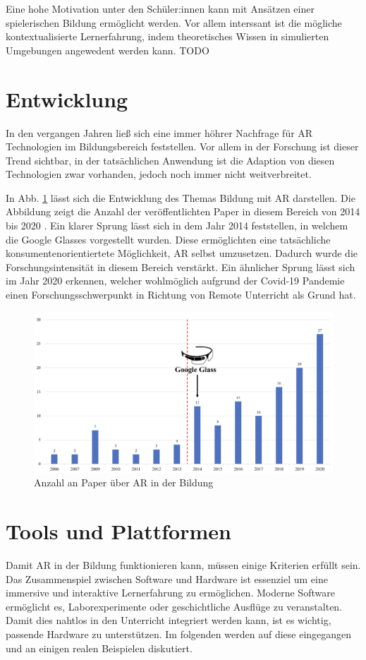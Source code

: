 \documentclass[conference]{IEEEtran}
\begin{document}
Eine hohe Motivation unter den Schüler:innen 
kann mit Ansätzen einer spielerischen Bildung ermöglicht werden. Vor allem interssant ist 
die mögliche kontextualisierte Lernerfahrung, indem theoretisches Wissen in simulierten 
Umgebungen angewedent werden kann. \cite{b2} TODO

\section{Entwicklung}
In den vergangen Jahren ließ sich eine immer höhrer Nachfrage für AR Technologien im Bildungsbereich
feststellen. Vor allem in der Forschung ist dieser Trend sichtbar, in der tatsächlichen Anwendung ist die
Adaption von diesen Technologien zwar vorhanden, jedoch noch immer nicht weitverbreitet. \cite{b3}

In Abb. \ref{fig1} lässt sich die Entwicklung des Themas Bildung mit AR darstellen. Die Abbildung zeigt die Anzahl
der veröffentlichten Paper in diesem Bereich von 2014 bis 2020 \cite{w2}. Ein klarer Sprung lässt sich in dem Jahr 2014 feststellen,
in welchem die Google Glasses vorgestellt wurden. Diese ermöglichten eine tatsächliche konsumentenorientiertete 
Möglichkeit, AR selbst umzusetzen. Dadurch wurde die Forschungsintensität in diesem Bereich verstärkt. 
Ein ähnlicher Sprung lässt sich im Jahr 2020 erkennen, welcher wohlmöglich aufgrund der Covid-19 Pandemie einen
Forschungsschwerpunkt in Richtung von Remote Unterricht als Grund hat.

\begin{figure}[htbp]
    \centerline{\includegraphics[scale=0.2]{img/entwicklung.png}}
    \caption{Anzahl an Paper über AR in der Bildung}
    \label{fig1}
\end{figure}

\section{Tools und Plattformen}\label{AA}
Damit AR in der Bildung funktionieren kann, müssen einige Kriterien erfüllt sein. Das Zusammenspiel
zwischen Software und Hardware ist essenziel um eine immersive und interaktive Lernerfahrung
zu ermöglichen. Moderne Software ermöglicht es, Laborexperimente oder geschichtliche Ausflüge
zu veranstalten. Damit dies nahtlos in den Unterricht integriert werden kann, ist es wichtig, passende
Hardware zu unterstützen.
Im folgenden werden auf diese eingegangen und an einigen realen Beispielen diskutiert.
\end{document}
